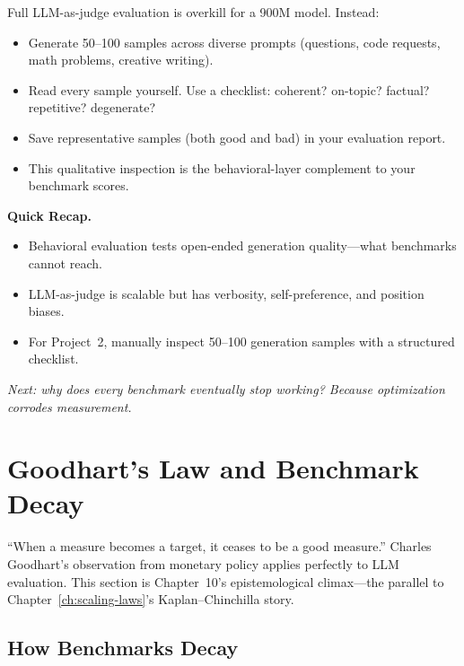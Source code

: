 \begin{tcolorbox}[colback=orange!5, colframe=orange!60, title=\textbf{For Project~2: Behavioral Evaluation}]
Full LLM-as-judge evaluation is overkill for a 900M model. Instead:
\begin{itemize}[nosep]
  \item Generate 50--100 samples across diverse prompts (questions, code requests, math problems, creative writing).
  \item Read every sample yourself. Use a checklist: coherent? on-topic? factual? repetitive? degenerate?
  \item Save representative samples (both good and bad) in your evaluation report.
  \item This qualitative inspection is the behavioral-layer complement to your benchmark scores.
\end{itemize}
\end{tcolorbox}

\begin{quickrecap}
\textbf{Quick Recap.}
\begin{itemize}[nosep,leftmargin=1.5em]
  \item Behavioral evaluation tests open-ended generation quality---what benchmarks cannot reach.
  \item LLM-as-judge is scalable but has verbosity, self-preference, and position biases.
  \item For Project~2, manually inspect 50--100 generation samples with a structured checklist.
\end{itemize}
\textit{Next: why does every benchmark eventually stop working? Because optimization corrodes measurement.}
\end{quickrecap}


\section{Goodhart's Law and Benchmark Decay}
\label{sec:goodhart}

``When a measure becomes a target, it ceases to be a good measure.'' Charles Goodhart's observation from monetary policy applies perfectly to LLM evaluation. This section is Chapter~10's epistemological climax---the parallel to Chapter~\ref{ch:scaling-laws}'s Kaplan--Chinchilla story.

\subsection{How Benchmarks Decay}

